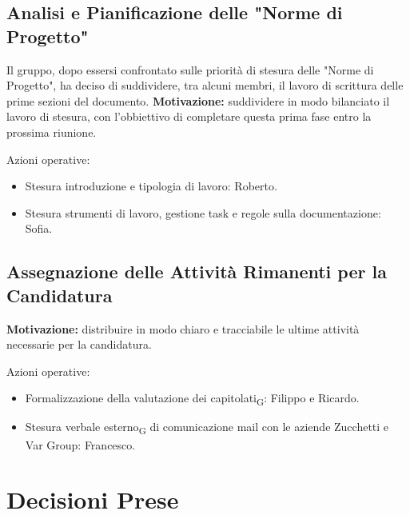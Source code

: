 \subsection{Analisi e Pianificazione delle "Norme di Progetto"}
Il gruppo, dopo essersi confrontato sulle priorità di stesura delle "Norme di Progetto", ha deciso di suddividere, tra alcuni membri, il lavoro di scrittura delle prime sezioni del documento.
\textbf{Motivazione:} suddividere in modo bilanciato il lavoro di stesura, con l'obbiettivo di completare questa prima fase entro la prossima riunione.

Azioni operative:
\begin{itemize}
    \item Stesura introduzione e tipologia di lavoro: Roberto.
    \item Stesura strumenti di lavoro, gestione task e regole sulla documentazione: Sofia.
\end{itemize}

\subsection{Assegnazione delle Attività Rimanenti per la Candidatura}
\textbf{Motivazione:} distribuire in modo chiaro e tracciabile le ultime attività necessarie per la candidatura.

Azioni operative:
\begin{itemize}
    \item Formalizzazione della valutazione dei capitolati\textsubscript{G}: Filippo e Ricardo.
    \item Stesura verbale esterno\textsubscript{G} di comunicazione mail con le aziende Zucchetti e Var Group: Francesco.
\end{itemize}

\section{Decisioni Prese}

